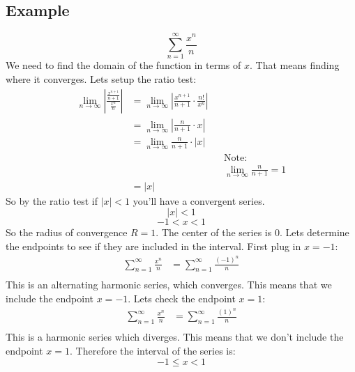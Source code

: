 \documentclass{report}
\begin{document}
    \subsection{Example}
        \[\sum_{n=1}^{\infty}  \frac{x^n}{n}\]
        We need to find the domain of the function in terms of \(x\).
        That means finding where it converges.
        Lets setup the ratio test:
        \begin{align*}
            \lim_{n \to \infty} \left| \frac{\frac{x^{n+1}}{n+1}}{\frac{x^n}{n}}\right|
            &= \lim_{n \to \infty} \left| \frac{x^{n+1}}{n+1} \cdot \frac{n!}{x^n}\right| \\
            &= \lim_{n \to \infty} \left| \frac{n}{n+1} \cdot x\right| \\
            &= \lim_{n \to \infty} \frac{n}{n+1} \cdot |x| \\
            && &\text{Note:} \\
            && &\lim_{n \to \infty} \frac{n}{n+1} = 1 \\
            &= |x|
        \end{align*}
        So by the ratio test if \(|x| < 1\) you'll have a convergent series.
        \[|x| < 1\]
        \[-1 < x < 1\]
        So the radius of convergence \(R = 1\).
        The center of the series is \(0\).
        Lets determine the endpoints to see if they are included in the interval.
        First plug in \(x = -1\):
        \begin{align*}
            \sum_{n=1}^{\infty}  \frac{x^n}{n} 
            &= \sum_{n=1}^{\infty}  \frac{(-1)^n}{n} \\
        \end{align*}
        This is an alternating harmonic series, which converges.
        This means that we include the endpoint \(x = -1\).
        Lets check the endpoint \(x = 1\):
        \begin{align*}
            \sum_{n=1}^{\infty}  \frac{x^n}{n} 
            &= \sum_{n=1}^{\infty}  \frac{(1)^n}{n} \\
        \end{align*} 
        This is a harmonic series which diverges.
        This means that we don't include the endpoint \(x = 1\).
        Therefore the interval of the series is:
        \[-1 \leq x < 1\]
    
\end{document}
